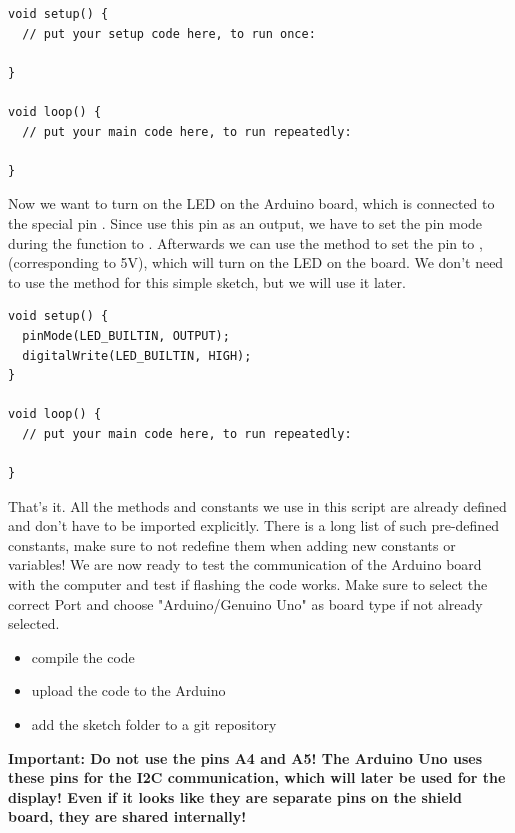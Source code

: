 \noindent\begin{minipage}{\textwidth}
\begin{lstlisting}[language=Arduino]
void setup() {
  // put your setup code here, to run once:

}

void loop() {
  // put your main code here, to run repeatedly:

}
\end{lstlisting}
\end{minipage}

Now we want to turn on the LED on the Arduino board, which is connected to the special pin . Since use this pin as an output, we have to set the pin mode during the  function to . Afterwards we can use the method  to set the pin to , (corresponding to 5V), which will turn on the LED on the board. We don't need to use the  method for this simple sketch, but we will use it later.

\noindent\begin{minipage}{\textwidth}
\begin{lstlisting}[language=Arduino]
void setup() {
  pinMode(LED_BUILTIN, OUTPUT);
  digitalWrite(LED_BUILTIN, HIGH);
}

void loop() {
  // put your main code here, to run repeatedly:

}
\end{lstlisting}
\end{minipage}

That's it. All the methods and constants we use in this script are already defined and don't have to be imported explicitly. There is a long list of such pre-defined constants, make sure to not redefine them when adding new constants or variables!
We are now ready to test the communication of the Arduino board with the computer and test if flashing the code works. Make sure to select the correct Port and choose "Arduino/Genuino Uno" as board type if not already selected.\newline

\begin{itemize}
	\item compile the code
	\item upload the code to the Arduino
	\item add the sketch folder to a git repository
\end{itemize}

\textbf{Important: Do not use the pins A4 and A5! The Arduino Uno uses these pins for the I2C communication, which will later be used for the display! Even if it looks like they are separate pins on the shield board, they are shared internally!}


